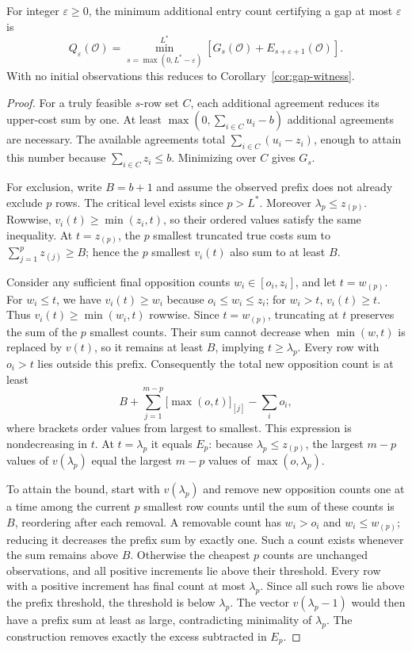\begin{proposition}
\label{prop:residual}
For integer $\varepsilon\ge0$, the minimum additional entry count certifying a gap at most $\varepsilon$ is
\[
 Q_\varepsilon(\mathcal O)=
 \min_{s=\max(0,L^*-\varepsilon)}^{L^*}
 \left[G_s(\mathcal O)+E_{s+\varepsilon+1}(\mathcal O)\right].
\]
With no initial observations this reduces to Corollary~\ref{cor:gap-witness}.
\end{proposition}
\begin{proof}
For a truly feasible $s$-row set $C$, each additional agreement reduces its upper-cost sum by one. At least $\max(0,\sum_{i\in C}u_i-b)$ additional agreements are necessary. The available agreements total $\sum_{i\in C}(u_i-z_i)$, enough to attain this number because $\sum_{i\in C}z_i\le b$. Minimizing over $C$ gives $G_s$.

For exclusion, write $B=b+1$ and assume the observed prefix does not already exclude $p$ rows. The critical level exists since $p>L^*$. Moreover $\lambda_p\le z_{(p)}$. Rowwise, $v_i(t)\ge\min(z_i,t)$, so their ordered values satisfy the same inequality. At $t=z_{(p)}$, the $p$ smallest truncated true costs sum to $\sum_{j=1}^p z_{(j)}\ge B$; hence the $p$ smallest $v_i(t)$ also sum to at least $B$.

Consider any sufficient final opposition counts $w_i\in[o_i,z_i]$, and let $t=w_{(p)}$. For $w_i\le t$, we have $v_i(t)\ge w_i$ because $o_i\le w_i\le z_i$; for $w_i>t$, $v_i(t)\ge t$. Thus $v_i(t)\ge\min(w_i,t)$ rowwise. Since $t=w_{(p)}$, truncating at $t$ preserves the sum of the $p$ smallest counts. Their sum cannot decrease when $\min(w,t)$ is replaced by $v(t)$, so it remains at least $B$, implying $t\ge\lambda_p$. Every row with $o_i>t$ lies outside this prefix. Consequently the total new opposition count is at least
\[
 B+\sum_{j=1}^{m-p}\big[\max(o,t)\big]_{[j]}-\sum_i o_i,
\]
where brackets order values from largest to smallest. This expression is nondecreasing in $t$. At $t=\lambda_p$ it equals $E_p$: because $\lambda_p\le z_{(p)}$, the largest $m-p$ values of $v(\lambda_p)$ equal the largest $m-p$ values of $\max(o,\lambda_p)$.

To attain the bound, start with $v(\lambda_p)$ and remove new opposition counts one at a time among the current $p$ smallest row counts until the sum of these counts is $B$, reordering after each removal. A removable count has $w_i>o_i$ and $w_i\le w_{(p)}$; reducing it decreases the prefix sum by exactly one. Such a count exists whenever the sum remains above $B$. Otherwise the cheapest $p$ counts are unchanged observations, and all positive increments lie above their threshold. Every row with a positive increment has final count at most $\lambda_p$. Since all such rows lie above the prefix threshold, the threshold is below $\lambda_p$. The vector $v(\lambda_p-1)$ would then have a prefix sum at least as large, contradicting minimality of $\lambda_p$. The construction removes exactly the excess subtracted in $E_p$.


\end{proof}
